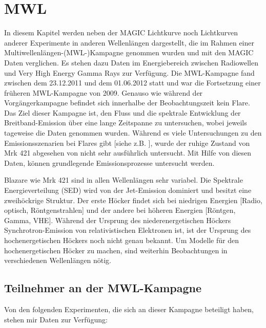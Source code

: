 \chapter{MWL}
In diesem Kapitel werden neben der MAGIC Lichtkurve noch Lichtkurven anderer Experimente in anderen Wellenlängen dargestellt, die im Rahmen einer Multiwellenlängen-(MWL-)Kampagne  genommen wurden und mit den MAGIC Daten verglichen.
Es stehen dazu Daten im Energiebereich zwischen Radiowellen und Very High Energy Gamma Rays zur Verfügung.
Die MWL-Kampagne fand zwischen dem 23.12.2011 und dem 01.06.2012 statt und war die Fortsetzung einer früheren MWL-Kampagne von 2009.
Genauso wie während der Vorgängerkampagne befindet sich innerhalbe der Beobachtungszeit kein Flare.
Das Ziel dieser Kampagne ist, den Fluss und die spektrale Entwicklung der Breitband-Emission über eine lange Zeitspanne zu untersuchen, wobei jeweils tageweise die Daten genommen wurden.
Während es viele Untersuchungen zu den Emissionsszenarien bei Flares gibt [siehe z.B. \cite{Mrk421Flare}], wurde der ruhige Zustand von Mrk 421 abgesehen von \cite{MWL2009} nicht sehr ausführlich untersucht.
Mit Hilfe von diesen Daten, können grundlegende Emissionsprozesse untersucht werden.

Blazare wie Mrk 421 sind in allen Wellenlängen sehr variabel.
Die Spektrale Energieverteilung (SED) wird von der Jet-Emission dominiert und besitzt eine zweihöckrige Struktur.
Der erste Höcker findet sich bei niedrigen Energien [Radio, optisch, Röntgenstrahlen] und der andere bei höheren Energien [Röntgen, Gamma, VHE].
Während der Ursprung des niederenergetischen Höckers Synchrotron-Emission von relativistischen Elektronen ist, ist der Ursprung des hochenergetischen Höckers noch nicht genau bekannt.
Um Modelle für den hochenergetischen Höcker zu machen, sind weiterhin Beobachtungen in verschiedenen Wellenlängen nötig. 
 

\section{Teilnehmer an der MWL-Kampagne}
Von den folgenden Experimenten, die sich an dieser Kampagne beteiligt haben, stehen mir Daten zur Verfügung:

